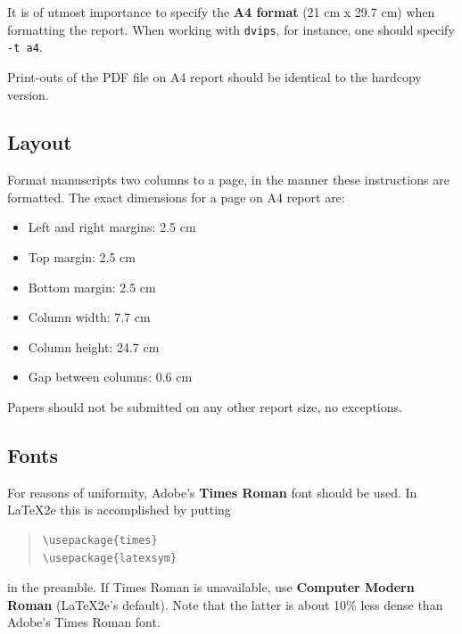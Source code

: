 \documentclass[11pt]{article}
\begin{document}
It is of utmost importance to specify the \textbf{A4 format} (21 cm
x 29.7 cm) when formatting the report. When working with
{\tt dvips}, for instance, one should specify {\tt -t a4}.

Print-outs of the PDF file on A4 report should be identical to the
hardcopy version.


\subsection{Layout}
\label{ssec:layout}

Format manuscripts two columns to a page, in the manner these
instructions are formatted. The exact dimensions for a page on A4
report are:

\begin{itemize}
\item Left and right margins: 2.5 cm
\item Top margin: 2.5 cm
\item Bottom margin: 2.5 cm
\item Column width: 7.7 cm
\item Column height: 24.7 cm
\item Gap between columns: 0.6 cm
\end{itemize}

\noindent Papers should not be submitted on any other report size, no exceptions.


\subsection{Fonts}

For reasons of uniformity, Adobe's {\bf Times Roman} font should be
used. In \LaTeX2e{} this is accomplished by putting

\begin{quote}
\begin{verbatim}
\usepackage{times}
\usepackage{latexsym}
\end{verbatim}
\end{quote}
in the preamble. If Times Roman is unavailable, use {\bf Computer
  Modern Roman} (\LaTeX2e{}'s default).  Note that the latter is about
  10\% less dense than Adobe's Times Roman font.
\end{document}
